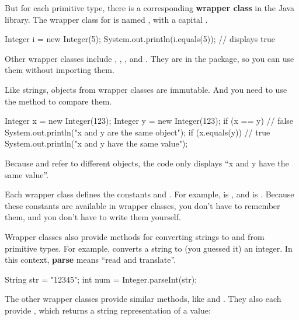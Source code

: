 
But for each primitive type, there is a corresponding {\bf wrapper class} in the Java library.
The wrapper class for  is named , with a capital .

\begin{code}
Integer i = new Integer(5);
System.out.println(i.equals(5));  // displays true
\end{code}

Other wrapper classes include , , , and .
They are in the  package, so you can use them without importing them.

Like strings, objects from wrapper classes are immutable.
And you need to use the  method to compare them.

\begin{code}
Integer x = new Integer(123);
Integer y = new Integer(123);
if (x == y) {                           // false
    System.out.println("x and y are the same object");
}
if (x.equals(y)) {                      // true
    System.out.println("x and y have the same value");
}
\end{code}

Because  and  refer to different  objects, the code only displays ``x and y have the same value''.

Each wrapper class defines the constants  and .
For example,  is , and  is .
Because these constants are available in wrapper classes, you don't have to remember them, and you don't have to write them yourself.


Wrapper classes also provide methods for converting strings to and from primitive types.
For example,  converts a string to (you guessed it) an integer.
In this context, {\bf parse} means ``read and translate''.

\begin{code}
String str = "12345";
int num = Integer.parseInt(str);
\end{code}

The other wrapper classes provide similar methods, like  and .
They also each provide , which returns a string representation of a value:

